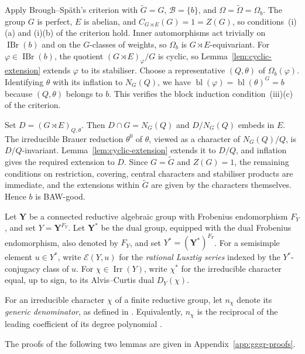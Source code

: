 \documentclass[10pt]{amsart}
\theoremstyle{definition}
\let\oldendproof\endproof
\renewenvironment{proof}[1][\proofname]{%
  \oldproof[\bfseries #1]%
}{\oldendproof}
\DeclareMathOperator{\IBr}{IBr}
\DeclareMathOperator{\Irr}{Irr}
\DeclareMathOperator{\bl}{bl}
\numberwithin{equation}{section}
\numberwithin{table}{section}
\begin{document}
\begin{proof}
Apply Brough--Sp\"ath's criterion
\cite[Theorem~3.18]{FengLiZhang2022Jordan} with
$\widetilde G=G$, $\mathcal B=\{b\}$, and
$\Omega=\widetilde\Omega=\Omega_b$.
The group $G$ is perfect, $E$ is abelian, and
$C_{G\rtimes E}(G)=1=Z(G)$, so conditions~\textup{(i)(a)} and
\textup{(i)(b)} of the criterion hold.
Inner automorphisms act trivially on $\IBr(b)$ and on the $G$-classes
of weights, so $\Omega_b$ is $G\rtimes E$-equivariant.
For $\varphi\in\IBr(b)$, the quotient
$(G\rtimes E)_\varphi/G$ is cyclic, so
Lemma~\ref{lem:cyclic-extension} extends $\varphi$ to its stabiliser.
Choose a representative $(Q,\theta)$ of $\Omega_b(\varphi)$.
Identifying $\theta$ with its inflation to $N_{G}(Q)$, we have
$\bl(\varphi)=\bl(\theta)^{G}=b$ because $(Q,\theta)$ belongs to $b$.
This verifies the block induction condition~\textup{(iii)(c)} of the
criterion.

Set $D=(G\rtimes E)_{Q,\theta}$.
Then $D\cap G=N_{G}(Q)$ and $D/N_{G}(Q)$ embeds in $E$.
The irreducible Brauer reduction $\theta^0$ of $\theta$, viewed as a
character of $N_{G}(Q)/Q$, is $D/Q$-invariant.
Lemma~\ref{lem:cyclic-extension} extends it to $D/Q$, and inflation
gives the required extension to $D$.
Since $G=\widetilde G$ and $Z(G)=1$, the remaining conditions on
restriction, covering, central characters and stabiliser products are
immediate, and the extensions within $\widetilde G$ are given by the
characters themselves.  Hence $b$ is BAW-good.
\end{proof}

Let $\mathbf Y$ be a connected reductive algebraic group with Frobenius
endomorphism $F_Y$, and set $Y=\mathbf Y^{F_Y}$. Let $\mathbf Y^*$ be
the dual group, equipped with the dual Frobenius endomorphism, also
denoted by $F_Y$, and set $Y^*=(\mathbf Y^*)^{F_Y}$. For a semisimple
element $u\in Y^*$, write $\mathcal E(Y,u)$ for the \emph{rational
Lusztig series} indexed by the $Y^*$-conjugacy class of $u$.
For $\chi\in\Irr(Y)$, write $\chi^*$ for the irreducible character
equal, up to sign, to its Alvis--Curtis dual $D_Y(\chi)$.

For an irreducible character $\chi$ of a finite reductive group,
let $n_\chi$ denote its \emph{generic denominator}, as defined in \cite[Section~3(B), p.~443]{GeckMalle2000}.
Equivalently, $n_\chi$ is the reciprocal of the leading coefficient of
its degree polynomial \cite[Remark~2.3.28]{GeckMalle2020}.

The proofs of the following two lemmas are given in
Appendix~\ref{app:gggr-proofs}.
\end{document}
